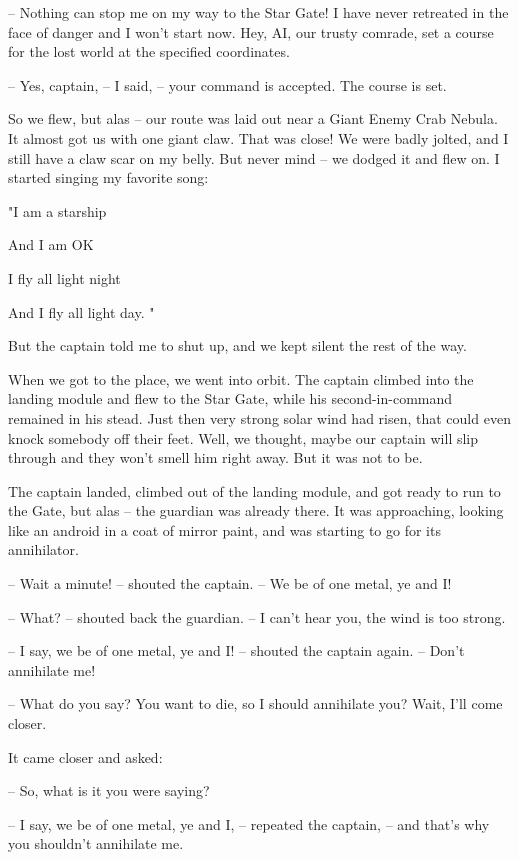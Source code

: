 \documentclass[ebook,twoside,final,openright]{memoir}
\begin{document}
– Nothing can stop me on my way to the Star Gate! I have never retreated in the face of danger and I won’t start now. Hey, AI, our trusty comrade, set a course for the lost world at the specified coordinates.\par
– Yes, captain, – I said, – your command is accepted. The course is set.\par
So we flew, but alas – our route was laid out near a Giant Enemy Crab Nebula. It almost got us with one giant claw. That was close! We were badly jolted, and I still have a claw scar on my belly. But never mind – we dodged it and flew on. I started singing my favorite song: \par
"I am a starship \par
 And I am OK \par
 I fly all light night \par
 And I fly all light day. "\par
 But the captain told me to shut up, and we kept silent the rest of the way.\par
\par
When we got to the place, we went into orbit. The captain climbed into the landing module and flew to the Star Gate, while his second-in-command remained in his stead. Just then very strong solar wind had risen, that could even knock somebody off their feet. Well, we thought, maybe our captain will slip through and they won’t smell him right away. But it was not to be.\par
\par
The captain landed, climbed out of the landing module, and got ready to run to the Gate, but alas – the guardian was already there. It was approaching, looking like an android in a coat of mirror paint, and was starting to go for its annihilator.\par
– Wait a minute! – shouted the captain. – We be of one metal, ye and I!\par
– What? – shouted back the guardian. – I can’t hear you, the wind is too strong.\par
– I say, we be of one metal, ye and I! – shouted the captain again. – Don’t annihilate me!\par
– What do you say? You want to die, so I should annihilate you? Wait, I'll come closer.\par
\par
It came closer and asked:\par
– So, what is it you were saying?\par
– I say, we be of one metal, ye and I, – repeated the captain, – and that’s why you shouldn’t annihilate me.\par
\end{document}
